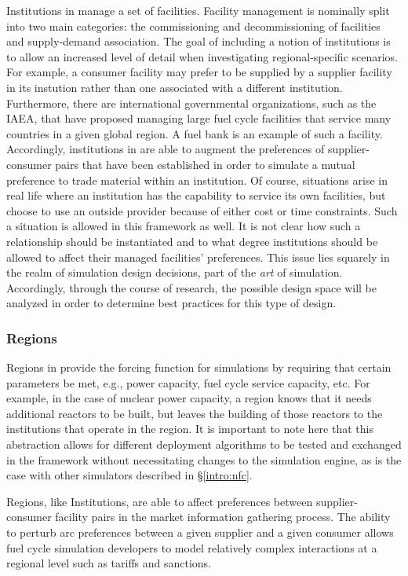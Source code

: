 Institutions in \Cyclus manage a set of facilities. Facility management is
nominally split into two main categories: the commissioning and decommissioning
of facilities and supply-demand association. The goal of including a notion of
institutions is to allow an increased level of detail when investigating
regional-specific scenarios. For example, a consumer facility may prefer to be
supplied by a supplier facility in its instution rather than one associated with
a different institution. Furthermore, there are international governmental
organizations, such as the IAEA, that have proposed managing large fuel cycle
facilities that service many countries in a given global region. A fuel bank is
an example of such a facility. Accordingly, institutions in \Cyclus are able to
augment the preferences of supplier-consumer pairs that have been established in
order to simulate a mutual preference to trade material within an
institution. Of course, situations arise in real life where an institution has
the capability to service its own facilities, but choose to use an outside
provider because of either cost or time constraints. Such a situation is allowed
in this framework as well. It is not clear how such a relationship should be
instantiated and to what degree institutions should be allowed to affect their
managed facilities' preferences. This issue lies squarely in the realm of
simulation design decisions, part of the \textit{art} of
simulation. Accordingly, through the course of research, the possible design
space will be analyzed in order to determine best practices for this type of
design.

\subsubsection{Regions}

Regions in \Cyclus provide the forcing function for simulations by requiring
that certain parameters be met, e.g., power capacity, fuel cycle service
capacity, etc. For example, in the case of nuclear power capacity, a region
knows that it needs additional reactors to be built, but leaves the building of
those reactors to the institutions that operate in the region. It is important
to note here that this abstraction allows for different deployment algorithms to
be tested and exchanged in the \Cyclus framework without necessitating changes
to the simulation engine, as is the case with other simulators described in
\S\ref{intro:nfc}.

Regions, like Institutions, are able to affect preferences between
supplier-consumer facility pairs in the market information gathering
process. The ability to perturb arc preferences between a given supplier and a
given consumer allows fuel cycle simulation developers to model relatively
complex interactions at a regional level such as tariffs and sanctions.

